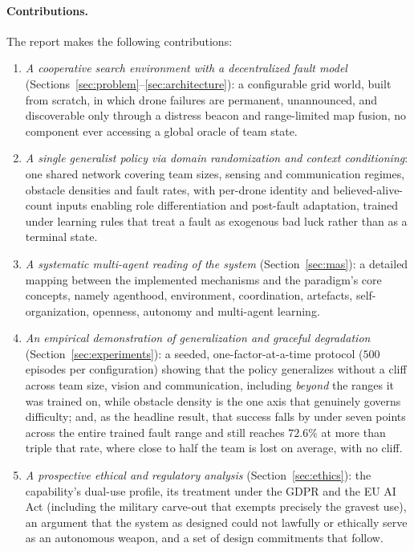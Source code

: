 \paragraph{Contributions.}
The report makes the following contributions:

\begin{enumerate}[leftmargin=2em]
  \item \emph{A cooperative search environment with a decentralized fault model}
    (Sections~\ref{sec:problem}--\ref{sec:architecture}): a configurable grid
    world, built from scratch, in which drone failures are permanent,
    unannounced, and discoverable only through a distress beacon and
    range-limited map fusion, no component ever accessing a global oracle of
    team state.
  \item \emph{A single generalist policy via domain randomization and context
    conditioning}: one shared network covering team sizes, sensing and
    communication regimes, obstacle densities and fault rates, with per-drone
    identity and believed-alive-count inputs enabling role differentiation and
    post-fault adaptation, trained under learning rules that treat a fault as
    exogenous bad luck rather than as a terminal state.
  \item \emph{A systematic multi-agent reading of the system}
    (Section~\ref{sec:mas}): a detailed mapping between the implemented
    mechanisms and the paradigm's core concepts, namely agenthood, environment,
    coordination, artefacts, self-organization, openness, autonomy and
    multi-agent learning.
  \item \emph{An empirical demonstration of generalization and graceful
    degradation} (Section~\ref{sec:experiments}): a seeded,
    one-factor-at-a-time protocol ($500$ episodes per configuration) showing
    that the policy generalizes without a cliff across team size, vision and
    communication, including \emph{beyond} the ranges it was trained on, while
    obstacle density is the one axis that genuinely governs difficulty; and, as
    the headline result, that success falls by under seven points across the
    entire trained fault range and still reaches $72.6\%$ at more than triple
    that rate, where close to half the team is lost on average, with no cliff.
  \item \emph{A prospective ethical and regulatory analysis}
    (Section~\ref{sec:ethics}): the capability's dual-use profile, its treatment
    under the GDPR and the EU AI Act (including the military carve-out that
    exempts precisely the gravest use), an argument that the system as designed
    could not lawfully or ethically serve as an autonomous weapon, and a set of
    design commitments that follow.
\end{enumerate}

